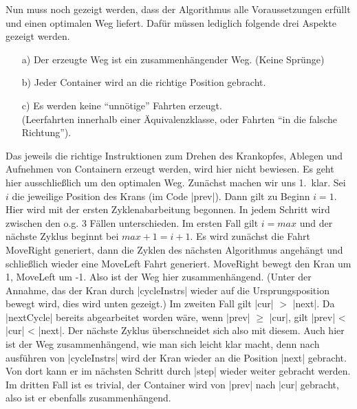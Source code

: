 Nun muss noch gezeigt werden, dass der Algorithmus alle Voraussetzungen erfüllt und einen optimalen Weg liefert.
Dafür müssen lediglich folgende drei Aspekte gezeigt werden.
\begin{enumerate}
 \item[a)] Der erzeugte Weg ist ein zusammenhängender Weg. (Keine Sprünge)
 \item[b)] Jeder Container wird an die richtige Position gebracht.
 \item[c)] Es werden keine ``unnötige'' Fahrten erzeugt. \\
       (Leerfahrten innerhalb einer Äquivalenzklasse, oder Fahrten ``in die falsche Richtung'').
\end{enumerate}
Das jeweils die richtige Instruktionen zum Drehen des Krankopfes, Ablegen und Aufnehmen von Containern erzeugt werden, wird hier nicht bewiesen.
Es geht hier ausschließlich um den optimalen Weg. Zunächst machen wir uns 1.\ klar. Sei $i$ die jeweilige Position des Krans (im Code |prev|).
Dann gilt zu Beginn $i = 1$. Hier wird mit der ersten Zyklenabarbeitung begonnen. In jedem Schritt wird zwischen den o.g. 3 Fällen unterschieden.
Im ersten Fall gilt $i=max$ und der nächste Zyklus beginnt bei $max+1=i+1$.
Es wird zunächst die Fahrt MoveRight generiert, dann die Zyklen des nächsten Algorithmus angehängt und schließlich wieder eine MoveLeft Fahrt generiert.
MoveRight bewegt den Kran um 1, MoveLeft um -1. Also ist der Weg hier zusammenhängend.
(Unter der Annahme, das der Kran durch |cycleInstrs| wieder auf die Ursprungsposition bewegt wird, dies wird unten gezeigt.)
Im zweiten Fall gilt |cur| $>$ |next|. Da |nextCycle| bereits abgearbeitet worden wäre, wenn |prev| $\geq$ |cur|, gilt |prev| < |cur| < |next|.
Der nächste Zyklus überschneidet sich also mit diesem.
Auch hier ist der Weg zusammenhängend, wie man sich leicht klar macht, denn nach ausführen von |cycleInstrs| wird der Kran wieder an die Position |next| gebracht.
Von dort kann er im nächsten Schritt durch |step| wieder weiter gebracht werden.
Im dritten Fall ist es trivial, der Container wird von |prev| nach |cur| gebracht, also ist er ebenfalls zusammenhängend.

